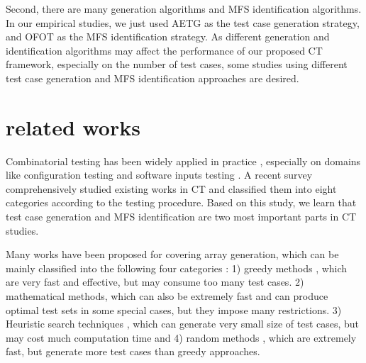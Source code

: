 \documentclass[10pt,journal,compsoc]{IEEEtran}
\begin{document}
Second, there are many generation algorithms and MFS identification algorithms. In our empirical studies, we just used AETG \cite{cohen1997aetg} as the test case generation strategy, and OFOT \cite{nie2011minimal} as the MFS identification strategy. As different generation and identification algorithms may affect the performance of our proposed CT framework, especially on the number of test cases, some studies using different test case generation and MFS identification approaches are desired.




\section{related works}\label{sec:related}
Combinatorial testing has been widely applied in practice \cite{kuhn2010practical}, especially on domains like configuration testing \cite{yilmaz2006covering,cohen2006testing,fouche2009incremental} and software inputs testing \cite{cohen1997aetg,borazjany2012combinatorial,garn2014eris}. A recent survey \cite{nie2011survey} comprehensively studied existing works in CT and classified them into eight categories according to the testing procedure. Based on this study, we learn that test case generation and MFS identification are two most important parts in CT studies.

Many works have been proposed for covering array generation, which can be mainly classified into the following four categories \cite{nie2011survey}: 1) greedy methods \cite{cohen1997aetg,lei2008ipog,bryce2005framework,bryce2007density}, which are very fast and effective, but may consume too many test cases.  2) mathematical methods\cite{hartman2005software,kobayashi2002design,williams2000determination,williams2002formulation}, which can also be extremely fast and can produce optimal test sets in some special cases, but they impose many restrictions. 3) Heuristic search techniques \cite{bryce2007one,cohen2003augmenting,cohen2003constructing,ghazi2003pair,shiba2004using,wu2015discrete} , which can generate very small size of test cases, but may cost much computation time and 4) random methods \cite{schroeder2004comparing,nie2015combinatorial}, which are extremely fast, but generate more test cases than greedy approaches.
\end{document}
